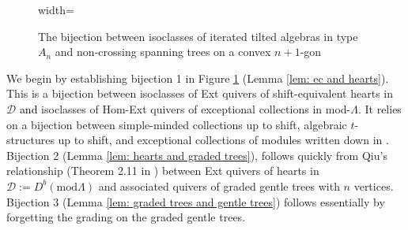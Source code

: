 \documentclass[12pt]{amsart}
\theoremstyle{definition}
\theoremstyle{remark}
\numberwithin{equation}{section}
\newcommand{\cD}{\ensuremath{{\mathcal{D}}}}
\begin{document}
\begin{figure}[h]
\begin{center}
\begin{adjustbox}{width=\textwidth}
\end{adjustbox}
    \caption{The bijection between isoclasses of iterated tilted algebras in type $A_n$ and non-crossing spanning trees on a convex $n+1$-gon}
    \label{fig: the bijection}
\end{center}
\end{figure}

We begin by establishing bijection 1 in Figure \ref{fig: the bijection} (Lemma \ref{lem: ec and hearts}). This is a bijection between isoclasses of Ext quivers of shift-equivalent hearts in $\cD$ \textcolor{black}{and} isoclasses of Hom-Ext quivers of exceptional collections in mod-$\Lambda$. It relies on a bijection between simple-minded collections up to shift, algebraic $t$-structures up to shift, and exceptional collections of modules written down in \cite{maresca2024exceptional}. Bijection 2 (Lemma \ref{lem: hearts and graded trees}), follows quickly from Qiu's relationship (Theorem 2.11 in \cite{qiu2013ext}) between Ext quivers of hearts in $\cD := D^b(\text{mod} \Lambda)$ and associated quivers of graded gentle trees with $n$ vertices. Bijection 3 (Lemma \ref{lem: graded trees and gentle trees}) follows essentially by forgetting the grading on the graded gentle trees. 
\end{document}
